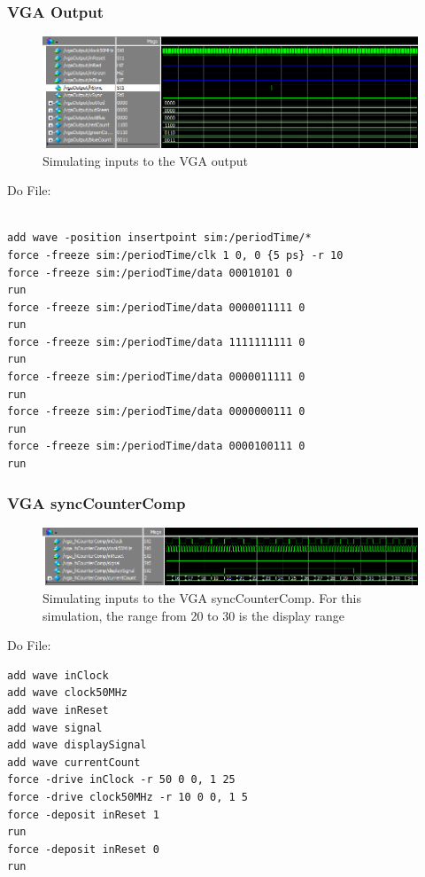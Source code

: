 \documentclass[a4paper]{article}
\begin{document}
\subsubsection{VGA Output}

\begin{figure}[H]
    \includegraphics[width=0.8 \linewidth]{images/vgaOutputSim.png}
    \caption{Simulating inputs to the VGA output}
    \label{vgaOutputSim}
\end{figure}

Do File:

\begin{Verbatim}

add wave -position insertpoint sim:/periodTime/*
force -freeze sim:/periodTime/clk 1 0, 0 {5 ps} -r 10
force -freeze sim:/periodTime/data 00010101 0
run
force -freeze sim:/periodTime/data 0000011111 0
run
force -freeze sim:/periodTime/data 1111111111 0
run
force -freeze sim:/periodTime/data 0000011111 0
run
force -freeze sim:/periodTime/data 0000000111 0
run
force -freeze sim:/periodTime/data 0000100111 0
run

\end{Verbatim}

\subsubsection{VGA syncCounterComp}

\begin{figure}[H]
    \includegraphics[width=0.8 \linewidth]{images/vgaHCounterCompSim.png}
    \caption{Simulating inputs to the VGA syncCounterComp. For this simulation, the range from 20 to 30 is the display range}
    \label{vgaSyncCounterCompSim}
\end{figure}

Do File:

\begin{Verbatim}
add wave inClock
add wave clock50MHz
add wave inReset
add wave signal
add wave displaySignal
add wave currentCount
force -drive inClock -r 50 0 0, 1 25
force -drive clock50MHz -r 10 0 0, 1 5
force -deposit inReset 1
run
force -deposit inReset 0
run
\end{Verbatim}
\end{document}
